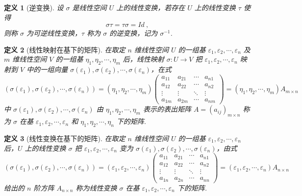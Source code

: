 \documentclass[zihao=-4,UTF8,linespread=1.8,nothm]{aytony_base}
\newtheorem{definition}{\indent 定义}[subsection]
\begin{document}
\begin{definition}[逆变换]
    设 $\sigma$ 是线性空间 $U$ 上的线性变换，若存在 $U$ 上的线性变换 $\tau$ 使得 $$
        \sigma \tau = \tau\sigma = Id\ ,
    $$ 则称 $\sigma$ 为可逆线性变换，$\tau$ 称为 $\sigma$ 的逆变换，记为 $\sigma^{-1}$.
\end{definition}

\begin{definition}[线性映射在基下的矩阵]
    在取定 $n$ 维线性空间 $U$ 的一组基 $\varepsilon_1, \varepsilon_2, \cdots, \varepsilon_n$ 及 $m$ 维线性空间 $V$ 的一组基 $\eta_1, \eta_2, \cdots, \eta_m$ 后，线性映射 $\sigma: U \to V$ 把 $\varepsilon_1, \varepsilon_2, \cdots, \varepsilon_n$ 映射到 $V$ 中的一组向量 $\sigma(\varepsilon_1), \sigma(\varepsilon_2), \cdots, \sigma(\varepsilon_n)$，在式 $$
        (\sigma(\varepsilon_1), \sigma(\varepsilon_2), \cdots, \sigma(\varepsilon_n)) = (\eta_1, \eta_2, \cdots, \eta_m) \left(
        \begin{matrix}
                a_{11} & a_{21} & \cdots & a_{n1} \\
                a_{12} & a_{22} & \cdots & a_{n2} \\
                \vdots & \vdots & \ddots & \vdots \\
                a_{1m} & a_{2m} & \cdots & a_{nm}
            \end{matrix}
        \right) = (\eta_1, \eta_2, \cdots, \eta_m)A_{m \times n}
    $$ 中 $\sigma(\varepsilon_1), \sigma(\varepsilon_2), \cdots, \sigma(\varepsilon_n)$ 由 $\eta_1, \eta_2, \cdots, \eta_m$ 表示的表出矩阵 $A = (a_{ij})_{m \times n}$ 称为 $\sigma$ 在基 $\varepsilon_1, \varepsilon_2, \cdots, \varepsilon_n$ 和 $\eta_1, \eta_2, \cdots, \eta_n$ 下的矩阵.
\end{definition}

\begin{definition}[线性变换在基下的矩阵]
    在取定 $n$ 维线性空间 $U$ 的一组基 $\varepsilon_1, \varepsilon_2, \cdots, \varepsilon_n$ 后，$U$ 上的线性变换 $\sigma$ 把 $\varepsilon_1, \varepsilon_2, \cdots, \varepsilon_n$ 变为 $\sigma(\varepsilon_1), \sigma(\varepsilon_2), \cdots, \sigma(\varepsilon_n)$，由式 $$
        (\sigma(\varepsilon_1), \sigma(\varepsilon_2), \cdots, \sigma(\varepsilon_n)) = (\varepsilon_1, \varepsilon_2, \cdots, \varepsilon_n) \left(
        \begin{matrix}
                a_{11} & a_{21} & \cdots & a_{n1} \\
                a_{12} & a_{22} & \cdots & a_{n2} \\
                \vdots & \vdots & \ddots & \vdots \\
                a_{1n} & a_{2n} & \cdots & a_{nn}
            \end{matrix}\right) = (\varepsilon_1, \varepsilon_2, \cdots, \varepsilon_n)A_{n \times n}
    $$ 给出的 $n$ 阶方阵 $A_{n \times n}$ 称为线性变换 $\sigma$ 在基 $\varepsilon_1, \varepsilon_2, \cdots, \varepsilon_n$ 下的矩阵.
\end{definition}
\end{document}
